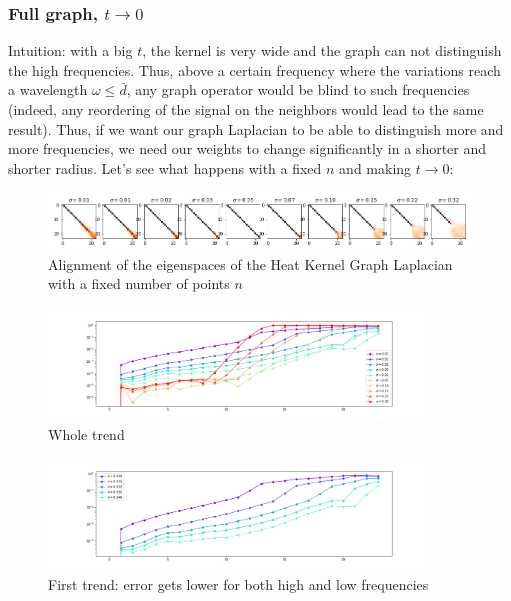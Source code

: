 \subsubsection{Full graph, $t\to 0$}
Intuition: with a big $t$, the kernel is very wide and the graph can not distinguish the high frequencies. Thus, above a certain frequency where the variations reach a wavelength $\omega \leq \bar d$, any graph operator would be blind to such frequencies (indeed, any reordering of the signal on the neighbors would lead to the same result). Thus, if we want our graph Laplacian to be able to distinguish more and more frequencies, we need our weights to change significantly in a shorter and shorter radius.
Let's see what happens with a fixed $n$ and making $t\to0$:
\begin{figure}[h]
	\label{fig:t_sensitivity_eigenspaces}
	\caption{Alignment of the eigenspaces of the Heat Kernel Graph Laplacian with a fixed number of points $n$}
	\centering
	\includegraphics[width=1\textwidth]{../codes/02.HeatKernelGraphLaplacian/HEALPix/06_figures/t_sensitivity.png}
	
\end{figure}
\begin{figure}
	\centering
	\includegraphics[width=0.9\textwidth]{../codes/02.HeatKernelGraphLaplacian/HEALPix/06_figures/t_sensitivity_diagonal.png}
	\caption{Whole trend}
	\label{fig:t_sensitivity_diagonal}
\end{figure}%
\begin{figure}
	\centering
	\includegraphics[width=0.9\textwidth]{../codes/02.HeatKernelGraphLaplacian/HEALPix/06_figures/t_sensitivity_diagonal_1.png}
	\caption{First trend: error gets lower for both high and low frequencies}
	\label{fig:t_sensitivity_diagonal_1}
\end{figure}%
